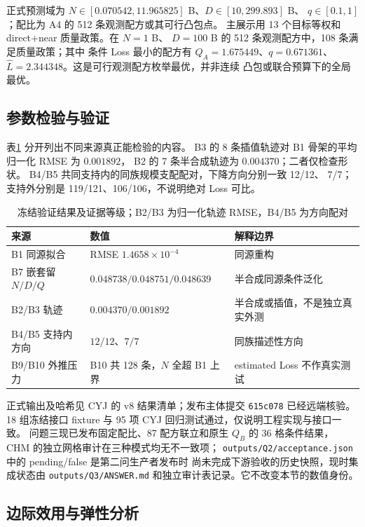 正式预测域为 $N\in[0.070542,11.965825]$ B、$D\in[10,299.893]$ B、
$q\in[0.1,1]$；配比为 A4 的 512 条观测配方或其可行凸包点。
主展示用 13 个目标等权和 direct+near 质量政策。在 $N=1$ B、
$D=100$ B 的 512 条观测配方中，108 条满足质量政策；其中
条件 Loss 最小的配方有 $Q_A=1.675449$、$q=0.671361$、
$\widehat L=2.344348$。这是可行观测配方枚举最优，并非连续
凸包或联合预算下的全局最优。

\subsection{参数检验与验证}

表\ref{tab:cyj-q2-validation} 分开列出不同来源真正能检验的内容。
B3 的 8 条插值轨迹对 B1 骨架的平均归一化 RMSE 为 $0.001892$，
B2 的 7 条半合成轨迹为 $0.004370$；二者仅检查形状。
B4/B5 共同支持内的同族规模支配配对，下降方向分别一致 12/12、
7/7；支持外分别是 119/121、106/106，不说明绝对 Loss 可比。

\begin{table}[htbp]
\centering\small
\caption{冻结验证结果及证据等级；B2/B3 为归一化轨迹 RMSE，B4/B5 为方向配对}
\label{tab:cyj-q2-validation}
\begin{tabular}{p{}p{}p{}}
\hline
来源 & 数值 & 解释边界\\ \hline
B1 同源拟合 & RMSE $1.4658\times10^{-4}$ & 同源重构\\
B7 嵌套留 $N/D/Q$ & $0.048738/0.048751/0.048639$ & 半合成同源条件泛化\\
B2/B3 轨迹 & $0.004370/0.001892$ & 半合成或插值，不是独立真实外测\\
B4/B5 支持内方向 & $12/12$、$7/7$ & 同族描述性方向\\
B9/B10 外推压力 & B10 共 128 条，$N$ 全超 B1 上界 & estimated Loss 不作真实测试\\ \hline
\end{tabular}
\end{table}

正式输出及哈希见 CYJ 的 v8 结果清单；发布主体提交
\texttt{615c078} 已经远端核验。18 组冻结接口 fixture
与 95 项 CYJ 回归测试通过，仅说明工程实现与接口一致。
问题三现已发布固定配比、87 配方联立和原生 $Q_B$ 的 36 格条件结果，
CHM 的独立网格审计在三种模式均无不一致项；
\texttt{outputs/Q2/acceptance.json} 中的 pending/false 是第二问生产者发布时
尚未完成下游验收的历史快照，现时集成状态由
\texttt{outputs/Q3/ANSWER.md} 和独立审计表记录。它不改变本节的数值身份。

\subsection{边际效用与弹性分析}

